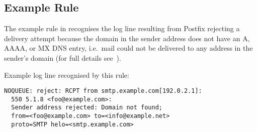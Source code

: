 \subsection{Example Rule}

\label{example rule in implementation}

The example rule in 
recognises the log line resulting from Postfix rejecting a delivery attempt
because the domain in the sender address does not have an A, AAAA, or MX
DNS entry, i.e.\ mail could not be delivered to any address in the sender's
domain (for full details see~\cite{reject-unknown-sender-domain}).

Example log line recognised by this rule:


\begin{verbatim}
NOQUEUE: reject: RCPT from smtp.example.com[192.0.2.1]:
  550 5.1.8 <foo@example.com>:
  Sender address rejected: Domain not found;
  from=<foo@example.com> to=<info@example.net>
  proto=SMTP helo=<smtp.example.com>
\end{verbatim}


